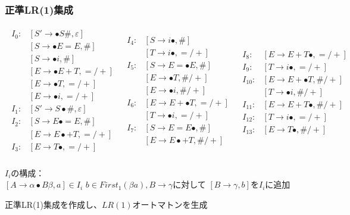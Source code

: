 \documentclass[ckj]{beamer}
\begin{document}
 \begin{frame}
  \frametitle{正準LR(1)集成}
{\tiny
\[
\begin{array}{ccc}
\begin{array}{cl}
I_0: & [S'\rightarrow\bullet S\#,\varepsilon]\\
     & [S\rightarrow\bullet E=E,\#]\\
     & [S\rightarrow\bullet i,\#]\\
     & [E\rightarrow\bullet E+T,=/+]\\
     & [E\rightarrow\bullet T,=/+]\\
     & [E\rightarrow\bullet i,=/+]\\
I_1: & [S'\rightarrow S\bullet\#,\varepsilon]\\
I_2: & [S\rightarrow E\bullet=E,\#]\\
     & [E\rightarrow E\bullet+T,=/+]\\
I_3: & [E\rightarrow T\bullet,=/+]\\
\end{array} &
\begin{array}{cl}
I_4: & [S\rightarrow i\bullet,\#]\\
     & [T\rightarrow i\bullet,=/+]\\
I_5: & [S\rightarrow E=\bullet E,\#]\\
     & [E\rightarrow\bullet T,\#/+]\\
     & [E\rightarrow\bullet i,\#/+]\\
I_6: & [E\rightarrow E+\bullet T,=/+]\\
     & [T\rightarrow \bullet i,=/+]\\
I_7: & [S\rightarrow E=E\bullet,\#]\\
     & [E\rightarrow E\bullet+T,\#/+]\\
\end{array} &
\begin{array}{cl}
I_8: & [E\rightarrow E+T\bullet,=/+]\\
I_9: & [T\rightarrow i\bullet,=/+]\\
I_{10}: & [E\rightarrow E+\bullet T,\#/+]\\
        & [T\rightarrow \bullet i,\#/+]\\
I_{11}: & [E\rightarrow E+T\bullet,\#/+]\\
I_{12}: & [T\rightarrow i\bullet,=/+]\\
I_{13}: & [E\rightarrow T\bullet,\#/+]
\end{array}
\end{array}
\]}


\begin{trivlist}
 \item $I_i$の構成：\\
       $[A\rightarrow\alpha\bullet B\beta,a]\in I_i$
       $b\in First_1(\beta a),B\rightarrow\gamma$に対して
       $[B\rightarrow\gamma,b]$を$I_i$に追加
 \item 正準LR(1)集成を作成し、$LR(1)$オートマトンを生成
\end{trivlist}
 \end{frame}
\end{document}
